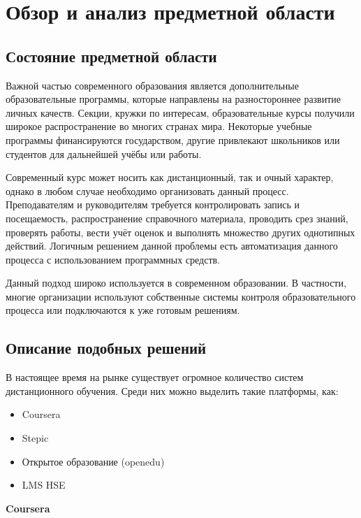 \documentclass[a4paper,14pt]{article}
\begin{document}
\section{Обзор и анализ предметной области}


\subsection{Состояние предметной области}

Важной частью современного образования является дополнительные образовательные программы, которые направлены на разностороннее развитие личных качеств.
Секции, кружки по интересам, образовательные курсы получили широкое распространение во многих странах мира.
Некоторые учебные программы финансируются государством, другие привлекают школьников или студентов для дальнейшей учёбы или работы.

Современный курс может носить как дистанционный, так и очный характер, однако в любом случае необходимо организовать данный процесс.
Преподавателям и руководителям требуется контролировать запись и посещаемость, распространение справочного материала, проводить срез знаний, проверять работы, вести учёт оценок и выполнять множество других однотипных действий.
Логичным решением данной проблемы есть автоматизация данного процесса с использованием программных средств.

Данный подход широко используется в современном образовании. В частности, многие организации используют собственные системы контроля образовательного процесса или подключаются к уже готовым решениям.

\subsection{Описание подобных решений}

В настоящее время на рынке существует огромное количество систем дистанционного обучения. Среди них можно выделить такие платформы, как:
\begin{itemize}
	\item Coursera
	\item Stepic
	\item Открытое образование (openedu)
	\item LMS HSE
\end{itemize}

\textbf{Coursera}
\end{document}
